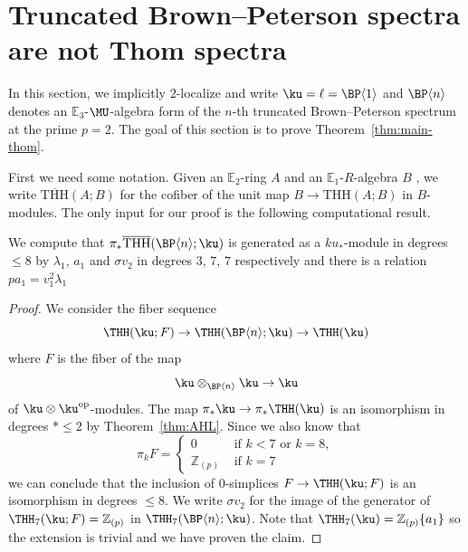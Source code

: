 \section{Truncated Brown--Peterson spectra are not Thom spectra}\label{notThom}

In this section, we implicitly $2$-localize and write $\ku=\ell=\BP\langle 1\rangle$ and $\BP\langle n\rangle$ denotes an $\mathbb{E}_3$-$\MU$-algebra form of the $n$-th truncated Brown--Peterson spectrum at the prime $p=2$. 
The goal of this section is to prove Theorem~\ref{thm:main-thom}. 

First we need some notation. Given an $\mathbb{E}_2$-ring $A$ and an $\mathbb{E}_1$-$R$-algebra $B$ , we write 
 $\overline{\mathrm{THH}}(A;B)$ for the cofiber of the unit map 
$B\to \mathrm{THH}(A;B)$ in $B$-modules. The only input for our proof is the following computational result. 

\begin{proposition}\label{prop-computational-input}
We compute that $\pi_*\overline{\mathrm{THH}}(\BP\langle n\rangle;\ku)$  is generated as a $ku_*$-module in degrees $\le 8$ by $\lambda_1$, $a_1$ and $\sigma v_2$ in degrees $3$, $7$, $7$ respectively and there is a relation $pa_1= v_1^2 \lambda_1$
\end{proposition}

\begin{proof}
We consider the fiber sequence  
\[ \THH(\ku;F) \to  \THH(\BP\langle n\rangle ; \ku )\to 
\THH(\ku) 
\]
where $F$ is the fiber of the map 
\[ \ku \otimes_{\BP\langle n \rangle }\ku \to \ku \]
of $\ku\otimes \ku^{\textup{op}}$-modules. 
The map $\pi_*\ku\to \pi_*\THH(\ku)$ is an isomorphism in degrees $*\le 2$ by Theorem~\ref{thm:AHL}. Since we also know that  
\[ 
\pi_k F = \begin{cases} 0 & \text{ if } k<7\text{ or } k = 8,\\
           \mathbb{Z}_{(p)} &\text{ if } k=7  
\end{cases}
\]
we can conclude that the inclusion of $0$-simplices $F\to \THH(\ku;F)$ is an isomorphism in degrees $\le 8$. We write $\sigma v_2$ for the image of the generator of $\THH_{7}(\ku;F)=\mathbb{Z}_{(p)}$ in $\THH_7(\BP\langle n\rangle ;\ku)$. Note that $\THH_7(\ku)=\mathbb{Z}_{(p)}\{a_1\}$ so the extension is trivial and we have proven the claim. 
\end{proof}


